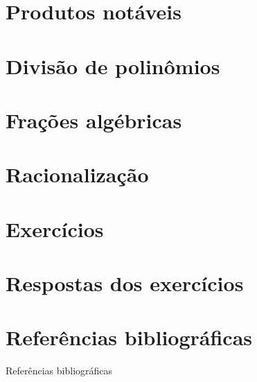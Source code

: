 \documentclass[14pt, aspectratio=169]{beamer}
\begin{document}
\section{Produtos notáveis}

\section{Divisão de polinômios}

\section{Frações algébricas}

\section{Racionalização}

\section{Exercícios}

\section{Respostas dos exercícios}

\section{Referências bibliográficas}

\begin{frame}{Referências bibliográficas}
    
\end{frame}
\end{document}
